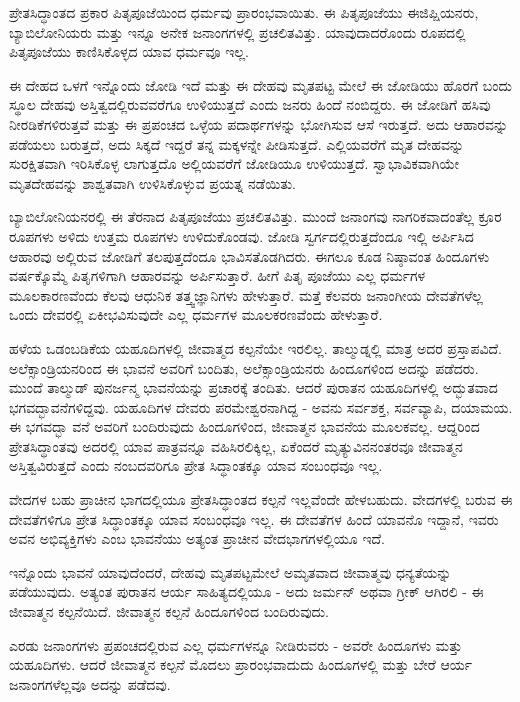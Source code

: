 ಪ್ರೇತಸಿದ್ಧಾಂತದ ಪ್ರಕಾರ ಪಿತೃಪೂಜೆಯಿಂದ ಧರ್ಮವು ಪ್ರಾರಂಭವಾಯಿತು. ಈ ಪಿತೃಪೂಜೆಯು ಈಜಿಪ್ಷಿಯನರು, ಬ್ಯಾಬಿಲೋನಿಯರು ಮತ್ತು ಇನ್ನೂ ಅನೇಕ ಜನಾಂಗಗಳಲ್ಲಿ ಪ್ರಚಲಿತವಿತ್ತು. ಯಾವುದಾದರೊಂದು ರೂಪದಲ್ಲಿ ಪಿತೃಪೂಜೆಯು ಕಾಣಿಸಿಕೊಳ್ಳದ ಯಾವ ಧರ್ಮವೂ ಇಲ್ಲ.

ಈ ದೇಹದ ಒಳಗೆ ಇನ್ನೊಂದು ಜೋಡಿ ಇದೆ ಮತ್ತು ಈ ದೇಹವು ಮೃತಪಟ್ಟ ಮೇಲೆ ಈ ಜೋಡಿಯು ಹೊರಗೆ ಬಂದು ಸ್ಥೂಲ ದೇಹವು ಅಸ್ತಿತ್ವದಲ್ಲಿರುವವರೆಗೂ ಉಳಿಯುತ್ತದೆ ಎಂದು ಜನರು ಹಿಂದೆ ನಂಬಿದ್ದರು. ಈ ಜೋಡಿಗೆ ಹಸಿವು ನೀರಡಿಕೆಗಳಿರುತ್ತವೆ ಮತ್ತು ಈ ಪ್ರಪಂಚದ ಒಳ್ಳೆಯ ಪದಾರ್ಥಗಳನ್ನು ಭೋಗಿಸುವ ಆಸೆ ಇರುತ್ತದೆ. ಅದು ಆಹಾರವನ್ನು ಪಡೆಯಲು ಬರುತ್ತದೆ, ಅದು ಸಿಕ್ಕದೆ ಇದ್ದರೆ ತನ್ನ ಮಕ್ಕಳನ್ನೇ ಪೀಡಿಸುತ್ತದೆ. ಎಲ್ಲಿಯವರೆಗೆ ಮೃತ ದೇಹವನ್ನು ಸುರಕ್ಷಿತವಾಗಿ ಇರಿಸಿಕೊಳ್ಳ ಲಾಗುತ್ತದೊ ಅಲ್ಲಿಯವರೆಗೆ ಜೋಡಿಯೂ ಉಳಿಯುತ್ತದೆ. ಸ್ವಾಭಾವಿಕವಾಗಿಯೇ ಮೃತದೇಹವನ್ನು ಶಾಶ್ವತವಾಗಿ ಉಳಿಸಿಕೊಳ್ಳುವ ಪ್ರಯತ್ನ ನಡೆಯಿತು.

ಬ್ಯಾಬಿಲೋನಿಯನರಲ್ಲಿ ಈ ತೆರನಾದ ಪಿತೃಪೂಜೆಯು ಪ್ರಚಲಿತವಿತ್ತು. ಮುಂದೆ ಜನಾಂಗವು ನಾಗರಿಕವಾದಂತೆಲ್ಲ ಕ್ರೂರ ರೂಪಗಳು ಅಳಿದು ಉತ್ತಮ ರೂಪಗಳು ಉಳಿದುಕೊಂಡವು. ಜೋಡಿ ಸ್ವರ್ಗದಲ್ಲಿರುತ್ತದೆಂದೂ ಇಲ್ಲಿ ಅರ್ಪಿಸಿದ ಆಹಾರವು ಅಲ್ಲಿರುವ ಜೋಡಿಗೆ ತಲಪುತ್ತದೆಂದೂ ಭಾವಿಸತೊಡಗಿದರು. ಈಗಲೂ ಕೂಡ ನಿಷ್ಠಾವಂತ ಹಿಂದೂಗಳು ವರ್ಷಕ್ಕೊಮ್ಮೆ ಪಿತೃಗಳಿಗಾಗಿ ಆಹಾರವನ್ನು ಅರ್ಪಿಸುತ್ತಾರೆ. ಹೀಗೆ ಪಿತೃ ಪೂಜೆಯು ಎಲ್ಲ ಧರ್ಮಗಳ ಮೂಲಕಾರಣವೆಂದು ಕೆಲವು ಆಧುನಿಕ ತತ್ತ್ವಜ್ಞಾನಿಗಳು ಹೇಳುತ್ತಾರೆ. ಮತ್ತೆ ಕೆಲವರು ಜನಾಂಗೀಯ ದೇವತೆಗಳೆಲ್ಲ ಒಂದು ದೇವರಲ್ಲಿ ಏಕೀಭವಿಸುವುದೇ ಎಲ್ಲ ಧರ್ಮಗಳ ಮೂಲಕರಣವೆಂದು ಹೇಳುತ್ತಾರೆ.

ಹಳೆಯ ಒಡಂಬಡಿಕೆಯ ಯಹೂದಿಗಳಲ್ಲಿ ಜೀವಾತ್ಮದ ಕಲ್ಪನೆಯೇ ಇರಲಿಲ್ಲ. ತಾಲ್ಮುಡ್ನಲ್ಲಿ ಮಾತ್ರ ಅದರ ಪ್ರಸ್ತಾಪವಿದೆ. ಅಲೆಕ್ಸಾಂಡ್ರಿಯನರಿಂದ ಈ ಭಾವನೆ ಅವರಿಗೆ ಬಂದಿತು, ಅಲೆಕ್ಸಾಂಡ್ರಿಯನರು ಹಿಂದೂಗಳಿಂದ ಅದನ್ನು ಪಡೆದರು. ಮುಂದೆ ತಾಲ್ಮುಡ್ ಪುನರ್ಜನ್ಮ ಭಾವನೆಯನ್ನು ಪ್ರಚಾರಕ್ಕೆ ತಂದಿತು. ಆದರೆ ಪುರಾತನ ಯಹೂದಿಗಳಲ್ಲಿ ಅದ್ಭುತವಾದ ಭಗವದ್ಭಾವನೆಗಳಿದ್ದವು. ಯಹೂದಿಗಳ ದೇವರು ಪರಮೇಶ್ವರನಾಗಿದ್ದ - ಅವನು ಸರ್ವಶಕ್ತ, ಸರ್ವವ್ಯಾಪಿ, ದಯಾಮಯ. ಈ ಭಗವದ್ಭಾ ವನೆ ಅವರಿಗೆ ಬಂದಿರುವುದು ಹಿಂದೂಗಳಿಂದ, ಜೀವಾತ್ಮನ ಭಾವನೆಯ ಮೂಲಕವಲ್ಲ. ಆದ್ದರಿಂದ ಪ್ರೇತಸಿದ್ಧಾಂತವು ಅದರಲ್ಲಿ ಯಾವ ಪಾತ್ರವನ್ನೂ ವಹಿಸಿರಲಿಕ್ಕಿಲ್ಲ, ಏಕೆಂದರೆ ಮೃತ್ಯುವಿನನಂತರವೂ ಜೀವಾತ್ಮನ ಅಸ್ತಿತ್ವವಿರುತ್ತದೆ ಎಂದು ನಂಬದವರಿಗೂ ಪ್ರೇತ ಸಿದ್ಧಾಂತಕ್ಕೂ ಯಾವ ಸಂಬಂಧವೂ ಇಲ್ಲ.

ವೇದಗಳ ಬಹು ಪ್ರಾಚೀನ ಭಾಗದಲ್ಲಿಯೂ ಪ್ರೇತಸಿದ್ಧಾಂತದ ಕಲ್ಪನೆ ಇಲ್ಲವೆಂದೇ ಹೇಳಬಹುದು. ವೇದಗಳಲ್ಲಿ ಬರುವ ಈ ದೇವತೆಗಳಿಗೂ ಪ್ರೇತ ಸಿದ್ಧಾಂತಕ್ಕೂ ಯಾವ ಸಂಬಂಧವೂ ಇಲ್ಲ. ಈ ದೇವತೆಗಳ ಹಿಂದೆ ಯಾವನೊ ಇದ್ದಾನೆ, ಇವರು ಅವನ ಅಭಿವ್ಯಕ್ತಿಗಳು ಎಂಬ ಭಾವನೆಯು ಅತ್ಯಂತ ಪ್ರಾಚೀನ ವೇದಭಾಗಗಳಲ್ಲಿಯೂ ಇದೆ.

ಇನ್ನೊಂದು ಭಾವನೆ ಯಾವುದೆಂದರೆ, ದೇಹವು ಮೃತಪಟ್ಟಮೇಲೆ ಅಮೃತವಾದ ಜೀವಾತ್ಮವು ಧನ್ಯತೆಯನ್ನು ಪಡೆಯುವುದು. ಅತ್ಯಂತ ಪುರಾತನ ಆರ್ಯ ಸಾಹಿತ್ಯದಲ್ಲಿಯೂ - ಅದು ಜರ್ಮನ್ ಅಥವಾ ಗ್ರೀಕ್ ಆಗಿರಲಿ - ಈ ಜೀವಾತ್ಮನ ಕಲ್ಪನೆಯಿದೆ. ಜೀವಾತ್ಮನ ಕಲ್ಪನೆ ಹಿಂದೂಗಳಿಂದ ಬಂದಿರುವುದು.

ಎರಡು ಜನಾಂಗಗಳು ಪ್ರಪಂಚದಲ್ಲಿರುವ ಎಲ್ಲ ಧರ್ಮಗಳನ್ನೂ ನೀಡಿರುವರು - ಅವರೇ ಹಿಂದೂಗಳು ಮತ್ತು ಯಹೂದಿಗಳು. ಆದರೆ ಜೀವಾತ್ಮನ ಕಲ್ಪನೆ ಮೊದಲು ಪ್ರಾರಂಭವಾದುದು ಹಿಂದೂಗಳಲ್ಲಿ ಮತ್ತು ಬೇರೆ ಆರ್ಯ ಜನಾಂಗಗಳೆಲ್ಲವೂ ಅದನ್ನು ಪಡೆದವು.

